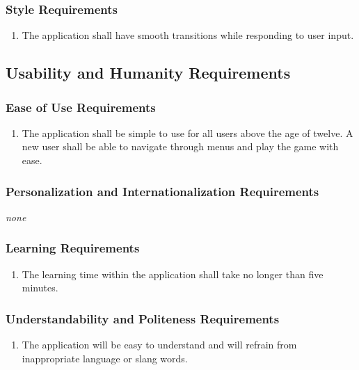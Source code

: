 \documentclass[12pt, titlepage]{article}
\begin{document}
\subsubsection{Style Requirements}
\label{ssub:style_requirements}
\begin{enumerate}[{LF}2. ]
	\item The application shall have smooth transitions while responding to user input. 
\end{enumerate}


\subsection{Usability and Humanity Requirements}
\label{sub:usability_and_humanity_requirements}

\subsubsection{Ease of Use Requirements}
\label{ssub:ease_of_use_requirements}
\begin{enumerate}[{UH}1. ]
	\item The application shall be simple to use for all users above the age of twelve. A new user shall be able to navigate through menus and play the game with ease.
\end{enumerate}

\subsubsection{Personalization and Internationalization Requirements}
\label{ssub:personalization_and_internationalization_requirements}
\emph{none}

\subsubsection{Learning Requirements}
\label{ssub:learning_requirements}
\begin{enumerate}[{UH}2. ]
	\item The learning time within the application shall take no longer than five minutes.
\end{enumerate}

\subsubsection{Understandability and Politeness Requirements}
\label{ssub:understandability_and_politeness_requirements}
\begin{enumerate}[{UH}3. ]
	\item The application will be easy to understand and will refrain from inappropriate language or slang words.
\end{enumerate}
\end{document}

